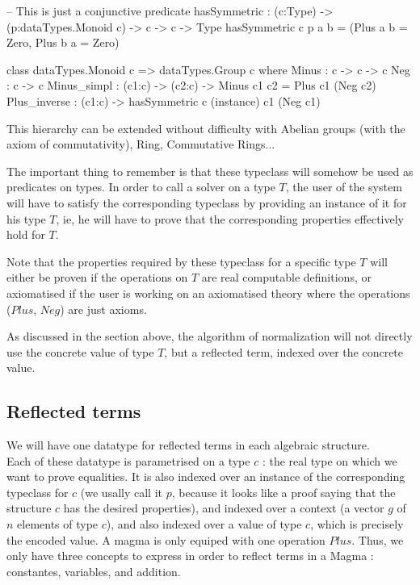 \documentclass{sigplanconf}
\begin{document}
\begin{code}[caption=Group, captionpos=b, label=lst1:haskell2]   
-- This is just a conjunctive predicate
hasSymmetric : (c:Type) -> (p:dataTypes.Monoid c) 
                -> c -> c -> Type
hasSymmetric c p a b = 
         (Plus a b = Zero, Plus b a = Zero)    
  
class dataTypes.Monoid c => dataTypes.Group c where
	Minus : c -> c -> c
	Neg : c -> c
	Minus_simpl : (c1:c) -> (c2:c) -> 
	             Minus c1 c2 = Plus c1 (Neg c2) 
	Plus_inverse : (c1:c) -> 
	             hasSymmetric c (instance) c1 (Neg c1)
\end{code}	

This hierarchy can be extended without difficulty with Abelian groups (with the axiom of commutativity), Ring, Commutative Rings...

The important thing to remember is that these typeclass will somehow be used as predicates on types. In order to call a solver on a type $T$, the user of the system will have to satisfy the corresponding typeclass by providing an instance of it for his type $T$, ie, he will have to prove that the corresponding properties effectively hold for $T$.

Note that the properties required by these typeclass for a specific type $T$ will either be proven if the operations on $T$ are real computable definitions, or axiomatised if the user is working on an axiomatised theory where the operations ($Plus$, $Neg$) are just axioms.

As discussed in the section above, the algorithm of normalization will not directly use the concrete value of type $T$, but a reflected term, indexed over the concrete value.


	\subsection {Reflected terms}

We will have one datatype for reflected terms in each algebraic structure. \\
Each of these datatype is parametrised on a type $c$ : the real type on which we want to prove equalities. It is also indexed over an instance of the corresponding typeclass for $c$ (we usally call it $p$, because it looks like a proof saying that the structure $c$ has the desired properties), and indexed over a context (a vector $g$ of $n$ elements of type $c$), and also indexed over a value of type $c$, which is precisely the encoded value.
A magma is only equiped with one operation $Plus$. Thus, we only have three concepts to express in order to reflect terms in a Magma : constantes, variables, and addition.
\end{document}
